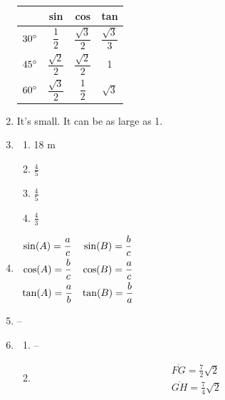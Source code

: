 \documentclass{article}
\begin{document}
\begin{enumerate}
	\begin{tabular}{| c | c | c | c |}
	\hline
	& sin & cos & tan \\
	\hline
	$30\degree$ & $\dfrac{1}{2}$ & $\dfrac{\sqrt{3}}{2}$ & $\dfrac{\sqrt{3}}{3}$ \\[1.5ex]
	\hline
	$45\degree$ & $\dfrac{\sqrt{2}}{2}$ & $\dfrac{\sqrt{2}}{2}$ & 1 \\[1.5ex]
	\hline
	$60\degree$ & $\dfrac{\sqrt{3}}{2}$ & $\dfrac{1}{2}$ & $\sqrt{3}$ \\[1.5ex]
	\hline
	\end{tabular}
	
\item It's small. It can be as large as 1.

\item

	\begin{enumerate}
	
	\item 18 m
	
	\item $\frac{4}{5}$
	
	\item $\frac{4}{5}$
	
	\item $\frac{4}{3}$
	
	\end{enumerate}
	
\item \phantom{x}

	$\begin{array}{ c c }
	\sin(A) = \dfrac{a}{c} & \sin(B) = \dfrac{b}{c} \\[1.5ex]
	\cos(A) = \dfrac{b}{c} & \cos(B) = \dfrac{a}{c} \\[1.5ex]
	\tan(A) = \dfrac{a}{b} & \tan(B) = \dfrac{b}{a}
	\end{array}$
	
\item --

\item

	\begin{enumerate}
	
	\item --
	
	\item \begin{align*}
		\overline{FG} = \frac{7}{2}\sqrt{2} \\
		\overline{GH} = \frac{7}{4}\sqrt{2}
		\end{align*}
		

\end{enumerate}
\end{enumerate}
\end{document}
